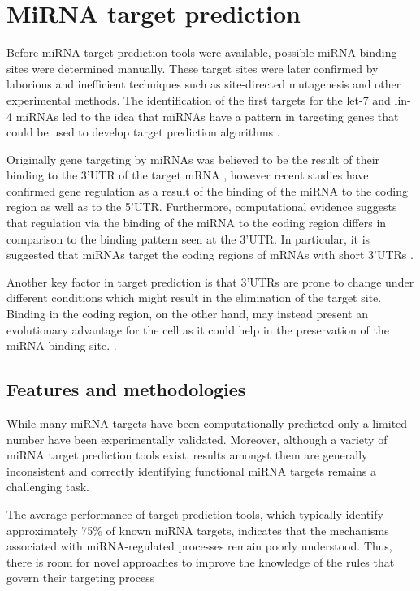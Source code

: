 \section{MiRNA target prediction}
Before miRNA target prediction tools were available, possible miRNA binding sites were
determined manually. These target sites were later confirmed by laborious and inefficient techniques such as site-directed mutagenesis and other experimental methods. The identification of the first targets for the let-7 and lin-4 miRNAs led to the idea that miRNAs have a pattern in targeting genes that could be used to develop target prediction algorithms \cite{first_predictions}.

Originally gene targeting by miRNAs was believed to be the result of their binding to the 3'UTR of the target mRNA \cite{multiple_binds}, however recent studies \cite{grosswendt} have confirmed gene regulation as a result of the binding of the miRNA to the coding region as well as to the 5'UTR. Furthermore, computational evidence suggests that regulation via the binding of the miRNA to the coding region differs in comparison to the binding pattern seen at the 3'UTR. In particular, it is suggested that miRNAs target the coding regions of mRNAs with short 3'UTRs \cite{functional_sites}.

Another key factor in target prediction is that 3'UTRs are prone to change under different conditions which might result in the elimination of the target site. Binding in the coding region, on the other hand, may instead present an evolutionary advantage for the cell as it could help in the preservation of the miRNA binding site. \cite{mirna_targets}. 

\subsection{Features and methodologies}
While many miRNA targets have been computationally predicted only a limited number
have been experimentally validated. Moreover, although a variety of miRNA target prediction tools exist, results amongst them are generally inconsistent and correctly identifying functional miRNA targets remains a challenging task.

The average performance of target prediction tools, which typically identify approximately 75\% of known miRNA targets, indicates that the mechanisms associated with miRNA-regulated processes remain poorly understood. Thus, there is room for novel approaches to improve the knowledge of the rules that govern their targeting process \cite{targeting_rules}

